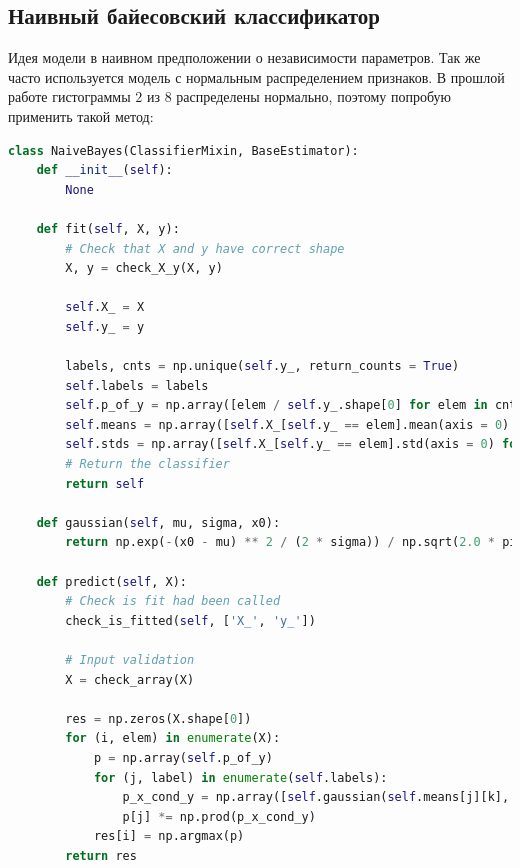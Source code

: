 \subsection{Наивный байесовский классификатор}
Идея модели в наивном предположении о независимости параметров. Так же часто используется модель с нормальным распределением признаков. 
В прошлой работе гистограммы $2$ из $8$ распределены нормально, поэтому попробую применить такой метод:
\begin{lstlisting}[language=Python]
class NaiveBayes(ClassifierMixin, BaseEstimator):
    def __init__(self):
        None

    def fit(self, X, y):
        # Check that X and y have correct shape
        X, y = check_X_y(X, y)

        self.X_ = X
        self.y_ = y

        labels, cnts = np.unique(self.y_, return_counts = True)
        self.labels = labels
        self.p_of_y = np.array([elem / self.y_.shape[0] for elem in cnts])
        self.means = np.array([self.X_[self.y_ == elem].mean(axis = 0) for elem in labels])
        self.stds = np.array([self.X_[self.y_ == elem].std(axis = 0) for elem in labels])
        # Return the classifier
        return self

    def gaussian(self, mu, sigma, x0):
        return np.exp(-(x0 - mu) ** 2 / (2 * sigma)) / np.sqrt(2.0 * pi * sigma)

    def predict(self, X):
        # Check is fit had been called
        check_is_fitted(self, ['X_', 'y_'])

        # Input validation
        X = check_array(X)

        res = np.zeros(X.shape[0])
        for (i, elem) in enumerate(X):
            p = np.array(self.p_of_y)
            for (j, label) in enumerate(self.labels):
                p_x_cond_y = np.array([self.gaussian(self.means[j][k], self.stds[j][k], elem[k]) for k in range(X.shape[1])])
                p[j] *= np.prod(p_x_cond_y)
            res[i] = np.argmax(p)
        return res
\end{lstlisting}
\pagebreak

